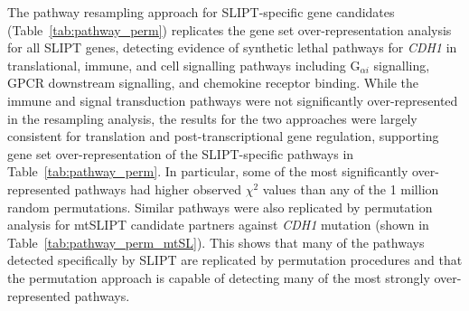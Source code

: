 The pathway resampling approach for \gls{SLIPT}-specific gene candidates (Table~\ref{tab:pathway_perm}) replicates the gene set over-represent\-ation analysis for all \gls{SLIPT} genes, detecting evidence of synthetic lethal pathways for \textit{CDH1} in translational, immune, and cell signalling pathways including  G$_{\alpha i}$ signalling, GPCR downstream signalling, and chemokine receptor binding. While the immune and signal transduction pathways were not significantly over-represented in the resampling analysis, the results for the two approaches were largely consistent for translation and post-transcriptional gene regulation, supporting gene set over-represent\-ation of the \gls{SLIPT}-specific pathways in Table~\ref{tab:pathway_perm}. In particular, some of the most significantly over-represented pathways had higher observed $\chi^2$ values than any of the 1 million random permutations. Similar pathways were also replicated by permutation analysis for mt\gls{SLIPT} candidate partners against \textit{CDH1} mutation (shown in Table~\ref{tab:pathway_perm_mtSL}). This shows that many of the pathways detected specifically by \gls{SLIPT} are replicated by permutation procedures and that the permutation approach is capable of detecting many of the most strongly over-represented pathways. 


